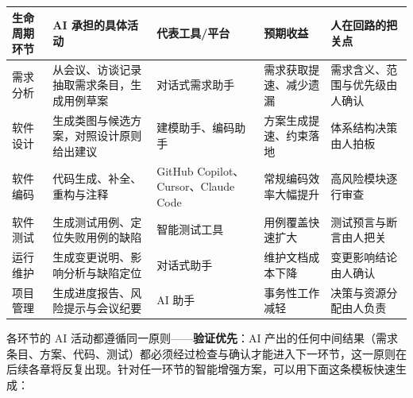 \documentclass[
]{ctexbook}
\newcounter{none}
\begin{document}
{\def\LTcaptype{none} %
\begin{longtable}[]{@{}
  >{\raggedright\arraybackslash}p{}
  >{\raggedright\arraybackslash}p{}
  >{\raggedright\arraybackslash}p{}
  >{\raggedright\arraybackslash}p{}
  >{\raggedright\arraybackslash}p{}@{}}
\toprule\noalign{}
\begin{minipage}[b]{\linewidth}\raggedright
生命周期环节
\end{minipage} & \begin{minipage}[b]{\linewidth}\raggedright
AI 承担的具体活动
\end{minipage} & \begin{minipage}[b]{\linewidth}\raggedright
代表工具/平台
\end{minipage} & \begin{minipage}[b]{\linewidth}\raggedright
预期收益
\end{minipage} & \begin{minipage}[b]{\linewidth}\raggedright
人在回路的把关点
\end{minipage} \\
\midrule\noalign{}
\endhead
\bottomrule\noalign{}
\endlastfoot
需求分析 & 从会议、访谈记录抽取需求条目，生成用例草案 & 对话式需求助手 &
需求获取提速、减少遗漏 & 需求含义、范围与优先级由人确认 \\
软件设计 & 生成类图与候选方案，对照设计原则给出建议 & 建模助手、编码助手
& 方案生成提速、约束落地 & 体系结构决策由人拍板 \\
软件编码 & 代码生成、补全、重构与注释 & GitHub Copilot、Cursor、Claude
Code & 常规编码效率大幅提升 & 高风险模块逐行审查 \\
软件测试 & 生成测试用例、定位失败用例的缺陷 & 智能测试工具 &
用例覆盖快速扩大 & 测试预言与断言由人把关 \\
运行维护 & 生成变更说明、影响分析与缺陷定位 & 对话式助手 &
维护文档成本下降 & 变更影响结论由人确认 \\
项目管理 & 生成进度报告、风险提示与会议纪要 & AI 助手 & 事务性工作减轻 &
决策与资源分配由人负责 \\
\end{longtable}
}

各环节的 AI 活动都遵循同一原则------\textbf{验证优先}：AI
产出的任何中间结果（需求条目、方案、代码、测试）都必须经过检查与确认才能进入下一环节，这一原则在后续各章将反复出现。针对任一环节的智能增强方案，可以用下面这条模板快速生成：
\end{document}
